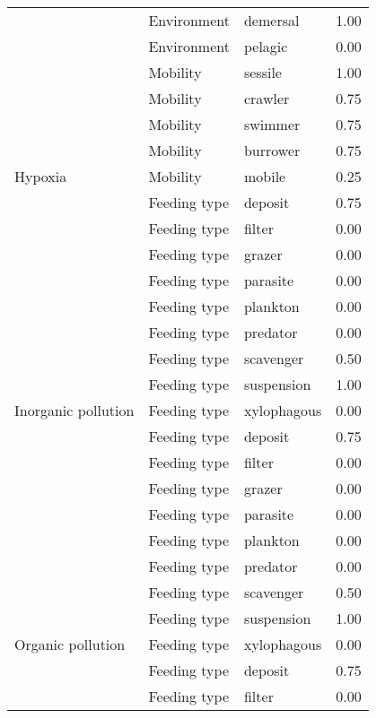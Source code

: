 \documentclass[
  12pt,
]{article}
\begin{document}
\begin{longtable}{llll}
 & Environment & demersal & 1.00\\
\cmidrule{2-4}
 & Environment & pelagic & 0.00\\
\cmidrule{2-4}
 & Mobility & sessile & 1.00\\
\cmidrule{2-4}
 & Mobility & crawler & 0.75\\
\cmidrule{2-4}
 & Mobility & swimmer & 0.75\\
\cmidrule{2-4}
 & Mobility & burrower & 0.75\\
\cmidrule{2-4}
\multirow{-11}{*}{\raggedright\arraybackslash Hypoxia} & Mobility & mobile & 0.25\\
\cmidrule{1-4}
 & Feeding type & deposit & 0.75\\
\cmidrule{2-4}
 & Feeding type & filter & 0.00\\
\cmidrule{2-4}
 & Feeding type & grazer & 0.00\\
\cmidrule{2-4}
 & Feeding type & parasite & 0.00\\
\cmidrule{2-4}
 & Feeding type & plankton & 0.00\\
\cmidrule{2-4}
 & Feeding type & predator & 0.00\\
\cmidrule{2-4}
 & Feeding type & scavenger & 0.50\\
\cmidrule{2-4}
 & Feeding type & suspension & 1.00\\
\cmidrule{2-4}
\multirow{-9}{*}{\raggedright\arraybackslash Inorganic pollution} & Feeding type & xylophagous & 0.00\\
\cmidrule{1-4}
 & Feeding type & deposit & 0.75\\
\cmidrule{2-4}
 & Feeding type & filter & 0.00\\
\cmidrule{2-4}
 & Feeding type & grazer & 0.00\\
\cmidrule{2-4}
 & Feeding type & parasite & 0.00\\
\cmidrule{2-4}
 & Feeding type & plankton & 0.00\\
\cmidrule{2-4}
 & Feeding type & predator & 0.00\\
\cmidrule{2-4}
 & Feeding type & scavenger & 0.50\\
\cmidrule{2-4}
 & Feeding type & suspension & 1.00\\
\cmidrule{2-4}
\multirow{-9}{*}{\raggedright\arraybackslash Organic pollution} & Feeding type & xylophagous & 0.00\\
\cmidrule{1-4}
 & Feeding type & deposit & 0.75\\
\cmidrule{2-4}
 & Feeding type & filter & 0.00\\
\cmidrule{2-4}

\end{longtable}
\end{document}
